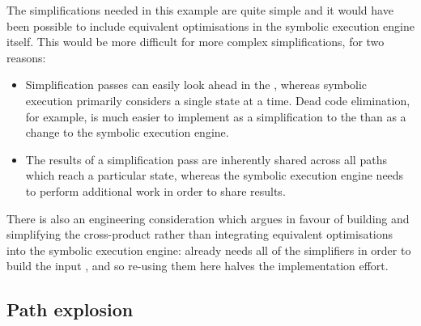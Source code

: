 The simplifications needed in this example are quite simple and it
would have been possible to include equivalent optimisations in the
symbolic execution engine itself.  This would be more difficult for
more complex simplifications, for two reasons:
\begin{itemize}
\item Simplification passes can easily look ahead in the
  {\StateMachine}, whereas symbolic execution primarily considers a
  single state at a time.  Dead code elimination, for example, is much
  easier to implement as a simplification to the {\StateMachine} than
  as a change to the symbolic execution engine.
\item The results of a simplification pass are inherently shared
  across all paths which reach a particular state, whereas the
  symbolic execution engine needs to perform additional work in order
  to share results.
\end{itemize}
There is also an engineering consideration which argues in favour of
building and simplifying the cross-product {\StateMachine} rather than
integrating equivalent optimisations into the symbolic execution
engine: {\implementation} already needs all of the simplifiers in
order to build the input {\StateMachines}, and so re-using them here
halves the implementation effort.


\subsection{Path explosion}

